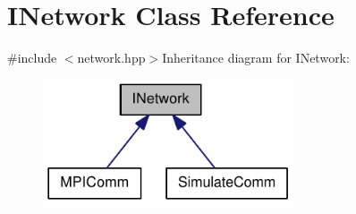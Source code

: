 \hypertarget{class_i_network}{
\section{INetwork Class Reference}
\label{class_i_network}
}


{\ttfamily \#include $<$network.hpp$>$}Inheritance diagram for INetwork:\nopagebreak
\begin{figure}[H]
\begin{center}
\leavevmode
\includegraphics[width=210pt]{class_i_network__inherit__graph}
\end{center}
\end{figure}
